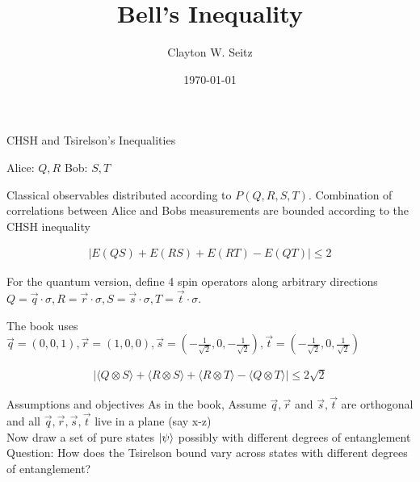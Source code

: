 \documentclass[aspectratio=1610]{beamer}					%
\title{Bell's Inequality}	%
\author{Clayton W. Seitz}								%
\date{\today}									%
\begin{document}
\begin{frame}
  \titlepage
\end{frame}

\begin{frame}{CHSH and Tsirelson's Inequalities}

\vspace{0.2in}

Alice: $Q,R$
Bob: $S, T$

\vspace{0.1in}
Classical observables distributed according to $P(Q,R,S,T)$. Combination of correlations between Alice and Bobs measurements are bounded according to the CHSH inequality

\begin{align*}
|E(QS) + E(RS) + E(RT) - E(QT)| \leq 2
\end{align*}

For the quantum version, define 4 spin operators along arbitrary directions $Q = \vec{q}\cdot\sigma, R = \vec{r}\cdot\sigma, S = \vec{s}\cdot\sigma, T = \vec{t}\cdot\sigma$.

The book uses $\vec{q} = (0,0,1), \vec{r} = (1,0,0), \vec{s} = (-\frac{1}{\sqrt{2}},0,-\frac{1}{\sqrt{2}}), \vec{t} = (-\frac{1}{\sqrt{2}},0,\frac{1}{\sqrt{2}})$

\begin{align*}
|\langle Q\otimes S\rangle + \langle R\otimes S\rangle  + \langle R\otimes T\rangle  - \langle Q\otimes T\rangle|  \leq 2\sqrt{2}
\end{align*}



\end{frame}

\begin{frame}{Assumptions and objectives}
As in the book, 
Assume $\vec{q},\vec{r}$ and $\vec{s},\vec{t}$ are orthogonal and all $\vec{q},\vec{r},\vec{s},\vec{t}$ live in a plane (say x-z)\\
\vspace{0.2in}
Now draw a set of pure states $\ket{\psi}$ possibly with different degrees of entanglement\\
\vspace{0.2in}
Question:  How does the Tsirelson bound vary across states with different degrees of entanglement?
\end{frame}
\end{document}
